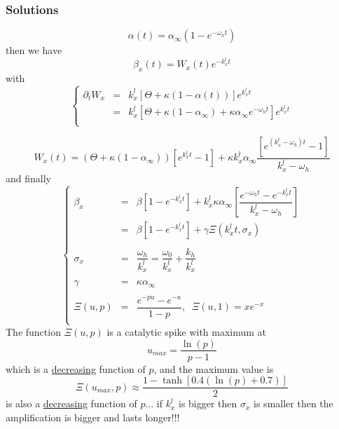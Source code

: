 \documentclass[aps,onecolumn,12pt]{revtex4}
\begin{document}
\subsubsection{Solutions}

\begin{equation}
	\alpha(t) = \alpha_\infty \left(1-e^{-\omega_ht}\right)
\end{equation}
then we have
\begin{equation}
	\beta_x(t) = W_x(t) e^{-k_x^l t }
\end{equation}
with
\begin{equation}
\left \lbrace
\begin{array}{rcl}
	\partial_tW_x & = & k_x^l \left[ \Theta + \kappa(1-\alpha(t)) \right] e^{k_x^lt} \\
	& = & k_x^l \left[ \Theta + \kappa(1-\alpha_\infty) + \kappa\alpha_\infty e^{-\omega_h t} \right] e^{k_x^lt} \\
\end{array}
\right.
\end{equation}
	
\begin{equation}
		W_x(t) = \left(\Theta+\kappa(1-\alpha_\infty)\right) \left[e^{k_x^l t}-1\right]
		+ \kappa k_x^l \alpha_\infty \dfrac{\left[e^{\left(k_x^l-\omega_h\right) t}-1\right]}{k_x^l-\omega_h}
\end{equation}	
and finally
\begin{equation}
\left\lbrace
\begin{array}{rcl}
	\beta_x & = & \beta \left[1-e^{-k_x^l t}\right] 
	+ k_x^l \kappa \alpha_\infty
	\left[
	 \dfrac{
	 e^{-\omega_h t} - e^{-k_x^l t}
	 }
	 {k_x^l-\omega_h}
	 \right]\\
	 & = & \beta \left[1-e^{-k_x^l t}\right] + \gamma \Xi\left(k_x^lt,\sigma_x\right)\\
	 \\
	 \sigma_x & = & \dfrac{\omega_h}{k_x^l} = \dfrac{\omega_0}{k_x^l} + \dfrac{k_h}{k_x^l} \\
	 \\
	 \gamma & = & \kappa \alpha_\infty \\
	 \\
	 \Xi\left(u,p\right) & = & \dfrac{e^{-pu}-e^{-u}}{1-p},\;\;\Xi(u,1)=xe^{-x}\\
\end{array}
\right.
\end{equation}
The function $\Xi\left(u,p\right)$ is a catalytic spike with maximum at 
\begin{equation}
	u_{max} = \dfrac{\ln(p)}{p-1}
\end{equation}
which is a \underline{decreasing} function of $p$, and the maximum value is
\begin{equation}
	\Xi\left(u_{max},p\right) \approx \dfrac{1-\tanh\left[ 0.4(\ln(p)+0.7)\right]}{2}
\end{equation}
is also a \underline{decreasing} function of $p$...
if $k_x^l$ is bigger then $\sigma_x$ is smaller then the amplification is bigger and lasts longer!!!
\end{document}
